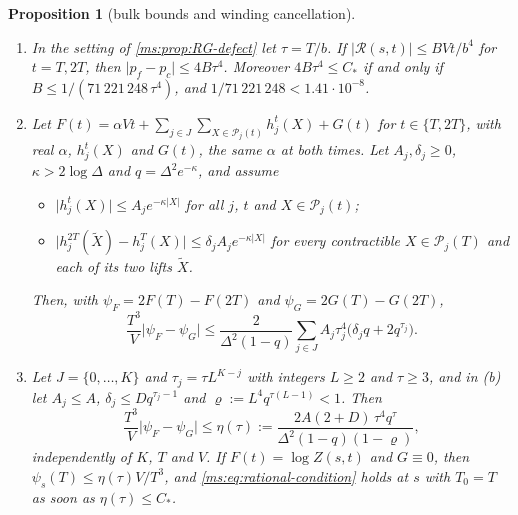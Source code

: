 \documentclass[11pt,a4paper]{amsart}
\newtheorem{proposition}[theorem]{Proposition}
\theoremstyle{definition}
\theoremstyle{remark}
\numberwithin{equation}{section}
\newcommand{\abs}[1]{\lvert #1\rvert}      %
\newcommand{\Zpart}[2]{Z(#1,#2)}           %
\newcommand{\psiT}[2]{\psi_{#1}(#2)}       %
\begin{document}
\begin{proposition}[bulk bounds and winding cancellation]\label{prop:balaban-constant}
\leavevmode
\begin{enumerate}[label=\textup{(\alph*)},leftmargin=*]
\item In the setting of \cref{ms:prop:RG-defect} let $\tau=T/b$. If $\abs{\mathcal R(s,t)}\le BVt/b^4$ for $t=T,2T$, then $\abs{p_f-p_c}\le4B\tau^4$. Moreover $4B\tau^4\le C_*$ if and only if $B\le1/(71\,221\,248\,\tau^4)$, and $1/71\,221\,248<1.41\cdot10^{-8}$.
\item Let $F(t)=\alpha Vt+\sum_{j\in J}\sum_{X\in\mathcal P_j(t)}h^t_j(X)+G(t)$ for $t\in\{T,2T\}$, with real $\alpha$, $h^t_j(X)$ and $G(t)$, the same $\alpha$ at both times. Let $A_j,\delta_j\ge0$, $\kappa>2\log\Delta$ and $q=\Delta^2e^{-\kappa}$, and assume
\begin{itemize}[leftmargin=3em]
\item[\textup{(D)}] $\abs{h^t_j(X)}\le A_je^{-\kappa\abs X}$ for all $j$, $t$ and $X\in\mathcal P_j(t)$;
\item[\textup{(L)}] $\abs{h^{2T}_j(\tilde X)-h^T_j(X)}\le\delta_jA_je^{-\kappa\abs X}$ for every contractible $X\in\mathcal P_j(T)$ and each of its two lifts $\tilde X$.
\end{itemize}
Then, with $\psi_F=2F(T)-F(2T)$ and $\psi_G=2G(T)-G(2T)$,
\begin{equation}\label{eq:winding-defect}
\frac{T^3}{V}\abs{\psi_F-\psi_G}\le\frac2{\Delta^2(1-q)}\sum_{j\in J}A_j\tau_j^4\bigl(\delta_jq+2q^{\tau_j}\bigr).
\end{equation}
\item Let $J=\{0,\dots,K\}$ and $\tau_j=\tau L^{K-j}$ with integers $L\ge2$ and $\tau\ge3$, and in \textup{(b)} let $A_j\le A$, $\delta_j\le Dq^{\tau_j-1}$ and $\varrho:=L^4q^{\tau(L-1)}<1$. Then
\[
\frac{T^3}V\abs{\psi_F-\psi_G}\le\eta(\tau):=\frac{2A(2+D)\,\tau^4q^\tau}{\Delta^2(1-q)(1-\varrho)},
\]
independently of $K$, $T$ and $V$. If $F(t)=\log\Zpart st$ and $G\equiv0$, then $\psiT sT\le\eta(\tau)V/T^3$, and \eqref{ms:eq:rational-condition} holds at $s$ with $T_0=T$ as soon as $\eta(\tau)\le C_*$.
\end{enumerate}
\end{proposition}
\end{document}

